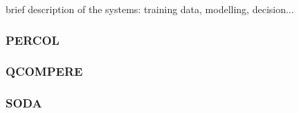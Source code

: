 brief description of the systems: training data, modelling, decision...
\subsubsection{PERCOL}


\subsubsection{QCOMPERE}


\subsubsection{SODA}

